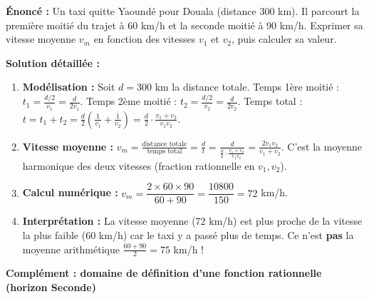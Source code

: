 \documentclass[11pt]{article}
\newcommand{\cle}[1]{{\popxbold\color{popdark}#1}}
\begin{document}
\begin{exoresolu}
\textbf{Énoncé :} Un taxi quitte Yaoundé pour Douala (distance 300 km). Il parcourt la première moitié du trajet à 60 km/h et la seconde moitié à 90 km/h. Exprimer sa vitesse moyenne $v_m$ en fonction des vitesses $v_1$ et $v_2$, puis calculer sa valeur.

\textbf{Solution détaillée :}
\begin{enumerate}
\item \textbf{Modélisation :} Soit $d = 300$ km la distance totale.
   Temps 1ère moitié : $t_1 = \frac{d/2}{v_1} = \frac{d}{2v_1}$.
   Temps 2ème moitié : $t_2 = \frac{d/2}{v_2} = \frac{d}{2v_2}$.
   Temps total : $t = t_1 + t_2 = \frac{d}{2}\left(\frac{1}{v_1} + \frac{1}{v_2}\right) = \frac{d}{2} \cdot \frac{v_1+v_2}{v_1v_2}$.
\item \textbf{Vitesse moyenne :} $v_m = \frac{\text{distance totale}}{\text{temps total}} = \frac{d}{t} = \frac{d}{\frac{d}{2} \cdot \frac{v_1+v_2}{v_1v_2}} = \frac{2v_1v_2}{v_1+v_2}$.
   C'est la \cle{moyenne harmonique} des deux vitesses (fraction rationnelle en $v_1, v_2$).
\item \textbf{Calcul numérique :} $v_m = \dfrac{2 \times 60 \times 90}{60 + 90} = \dfrac{10800}{150} = 72$ km/h.
\item \textbf{Interprétation :} La vitesse moyenne (72 km/h) est plus proche de la vitesse la plus faible (60 km/h) car le taxi y a passé plus de temps. Ce n'est \textbf{pas} la moyenne arithmétique $\frac{60+90}{2}=75$ km/h !
\end{enumerate}
\end{exoresolu}

\textbf{Complément : domaine de définition d'une fonction rationnelle (horizon Seconde)}\par
\end{document}
